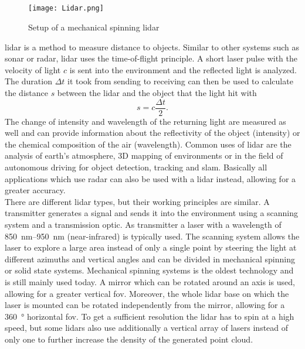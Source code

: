\subsection{}
\begin{figure}[htb]
    \centering
    \texttt{[image: Lidar.png]}
    \caption{Setup of a mechanical spinning \acrshort{lidar} \cite{Li2020}}
    \label{fig:lidar}
\end{figure}
\gls{lidar} is a method to measure distance to objects.
Similar to other systems such as \gls{sonar} or \gls{radar}, \gls{lidar} uses the time-of-flight principle.
A short laser pulse with the velocity of light $c$ is sent into the environment and the reflected light is analyzed.
The duration $\Delta t$ it took from sending to receiving can then be used to calculate the distance $s$ between the \gls{lidar} and the object that the light hit with
\begin{equation}
    s = c\frac{\Delta t}{2}.
\end{equation}
The change of intensity and wavelength of the returning light are measured as well and can provide information about the reflectivity of the object (intensity) or the chemical composition of the air (wavelength).
Common uses of \gls{lidar} are the analysis of earth's atmosphere, 3D mapping of environments or in the field of autonomous driving for object detection, tracking and \gls{slam}.
Basically all applications which use \gls{radar} can also be used with a \gls{lidar} instead, allowing for a greater accuracy.\\
There are different \gls{lidar} types, but their working principles are similar.
A transmitter generates a signal and sends it into the environment using a scanning system and a transmission optic.
As transmitter a laser with a wavelength of \SIrange{850}{950}{\nano\metre} (near-infrared) is typically used.
The scanning system allows the laser to explore a large area instead of only a single point by steering the light at different azimuths and vertical angles and can be divided in mechanical spinning or solid state systems.
Mechanical spinning systems is the oldest technology and is still mainly used today.
A mirror which can be rotated around an axis is used, allowing for a greater vertical \gls{fov}.
Moreover, the whole \gls{lidar} base on which the laser is mounted can be rotated independently from the mirror, allowing for a \SI{360}{\degree} horizontal \gls{fov}.
To get a sufficient resolution the \gls{lidar} has to spin at a high speed, but some \gls{lidar}s also use additionally a vertical array of lasers instead of only one to further increase the density of the generated point cloud.
